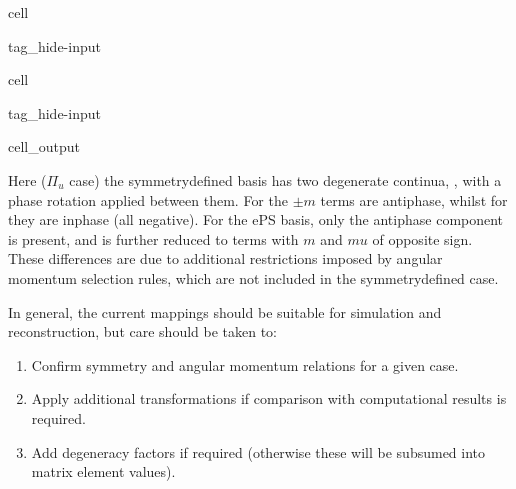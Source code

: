 \documentclass[letterpaper,table,10pt,english]{jupyterBook}
\begin{document}
\begin{sphinxuseclass}{cell}
\begin{sphinxuseclass}{tag_hide-input}
\end{sphinxuseclass}
\end{sphinxuseclass}
\begin{sphinxuseclass}{cell}
\begin{sphinxuseclass}{tag_hide-input}\begin{sphinxVerbatimOutput}

\begin{sphinxuseclass}{cell_output}
\end{sphinxuseclass}\end{sphinxVerbatimOutput}

\end{sphinxuseclass}
\end{sphinxuseclass}
\sphinxAtStartPar
Here (\(\Pi_u\) case) the symmetry\sphinxhyphen{}defined basis has two degenerate continua, , with a phase rotation applied between them. For  the \(\pm m\) terms are anti\sphinxhyphen{}phase, whilst for  they are in\sphinxhyphen{}phase (all negative). For the ePS basis, only the anti\sphinxhyphen{}phase component is present, and is further reduced to terms with \(m\) and \(mu\) of opposite sign. These differences are due to additional restrictions imposed by angular momentum selection rules, which are not included in the symmetry\sphinxhyphen{}defined case.

\sphinxAtStartPar
In general, the current mappings should be suitable for simulation and reconstruction, but care should be taken to:
\begin{enumerate}
%
\item {} 
\sphinxAtStartPar
Confirm symmetry and angular momentum relations for a given case.

\item {} 
\sphinxAtStartPar
Apply additional transformations if comparison with computational results is required.

\item {} 
\sphinxAtStartPar
Add degeneracy factors if required (otherwise these will be subsumed into matrix element values).

\end{enumerate}

\sphinxstepscope
\end{document}
